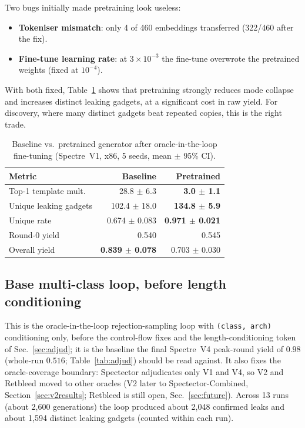 \documentclass[conference]{IEEEtran}
\begin{document}
Two bugs initially made pretraining look useless:
\begin{itemize}[itemsep=1pt,leftmargin=1.2em]
  \item \textbf{Tokeniser mismatch}: only 4 of 460 embeddings transferred
    (322/460 after the fix).
  \item \textbf{Fine-tune learning rate}: at $3\times10^{-3}$ the fine-tune
    overwrote the pretrained weights (fixed at $10^{-4}$).
\end{itemize}
With both fixed, Table~\ref{tab:pretrain} shows that pretraining strongly
reduces mode collapse and increases distinct leaking gadgets, at a significant
cost in raw yield. For discovery, where many distinct gadgets beat repeated
copies, this is the right trade.

\begin{table}[t]
\centering
\caption{Baseline vs.\ pretrained generator after oracle-in-the-loop fine-tuning (Spectre~V1,
  x86, 5 seeds, mean $\pm$ 95\% CI).}
\label{tab:pretrain}
\footnotesize
\setlength{\tabcolsep}{3pt}
\begin{tabular}{@{}lrr@{}}
\toprule
Metric & Baseline & Pretrained \\
\midrule
Top-1 template mult. & 28.8 $\pm$ 6.3 & \textbf{3.0 $\pm$ 1.1} \\
Unique leaking gadgets      & 102.4 $\pm$ 18.0 & \textbf{134.8 $\pm$ 5.9} \\
Unique rate                 & 0.674 $\pm$ 0.083 & \textbf{0.971 $\pm$ 0.021} \\
Round-0 yield               & 0.540 & 0.545 \\
Overall yield               & \textbf{0.839 $\pm$ 0.078} & 0.703 $\pm$ 0.030 \\
\bottomrule
\end{tabular}
\end{table}

\subsection{Base multi-class loop, before length conditioning}
This is the oracle-in-the-loop rejection-sampling loop with \texttt{(class, arch)} conditioning only, before the
control-flow fixes and the length-conditioning token of Sec.~\ref{sec:adjud}; it is
the baseline the final Spectre~V4 peak-round yield of $0.98$ (whole-run $0.516$; Table~\ref{tab:adjud}) should be
read against. It also fixes the oracle-coverage boundary: Spectector adjudicates only
V1 and V4, so V2 and Retbleed moved to other oracles (V2 later to Spectector-Combined,
Section~\ref{sec:v2results}; Retbleed is still open, Sec.~\ref{sec:future}).
Across 13 runs (about 2,600 generations) the loop produced about 2,048 confirmed
leaks and about 1,594 distinct leaking gadgets (counted within each run).
\end{document}
